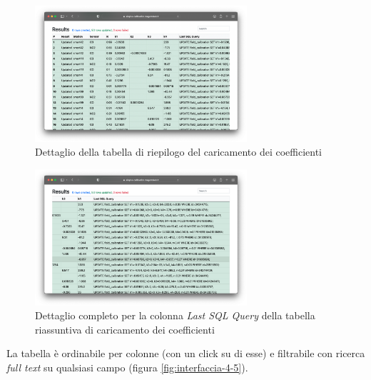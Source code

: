 \begin{figure}[H]
\centering
\includegraphics[width=0.70\textwidth,height=\textheight,keepaspectratio]{img/interfaccia_3}
\caption{Dettaglio della tabella di riepilogo del caricamento dei coefficienti}
\label{fig:interfaccia-3}
\end{figure}

\begin{figure}[H]
\centering
\includegraphics[width=0.70\textwidth,height=\textheight,keepaspectratio]{img/interfaccia_6}
\caption{Dettaglio completo per la colonna \textit{Last SQL Query} della tabella riassuntiva di caricamento dei coefficienti}
\label{fig:interfaccia-6}
\end{figure}

La tabella è ordinabile per colonne (con un click su di esse) e filtrabile con ricerca \textit{full text} su qualsiasi campo (figura \ref{fig:interfaccia-4-5}).

